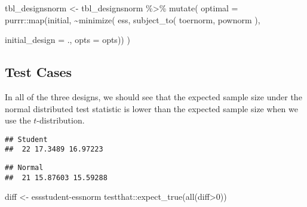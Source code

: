 \documentclass[
]{book}
\newenvironment{Shaded}{\begin{snugshade}}{\end{snugshade}}
\newcommand{\AttributeTok}[1]{\textcolor[rgb]{0.77,0.63,0.00}{#1}}
\newcommand{\DecValTok}[1]{\textcolor[rgb]{0.00,0.00,0.81}{#1}}
\newcommand{\FunctionTok}[1]{\textcolor[rgb]{0.00,0.00,0.00}{#1}}
\newcommand{\NormalTok}[1]{#1}
\newcommand{\OtherTok}[1]{\textcolor[rgb]{0.56,0.35,0.01}{#1}}
\newcommand{\SpecialCharTok}[1]{\textcolor[rgb]{0.00,0.00,0.00}{#1}}
\begin{document}
\begin{Shaded}
\begin{Highlighting}[]
\NormalTok{tbl\_designsnorm }\OtherTok{\textless{}{-}}\NormalTok{ tbl\_designsnorm }\SpecialCharTok{\%\textgreater{}\%} 
    \FunctionTok{mutate}\NormalTok{(}
       \AttributeTok{optimal =}\NormalTok{ purrr}\SpecialCharTok{::}\FunctionTok{map}\NormalTok{(initial, }\SpecialCharTok{\textasciitilde{}}\FunctionTok{minimize}\NormalTok{(}
\NormalTok{          ess,}
          \FunctionTok{subject\_to}\NormalTok{(}
\NormalTok{              toernorm,}
\NormalTok{              pownorm}
\NormalTok{          ),}
          
          \AttributeTok{initial\_design =}\NormalTok{ ., }
          \AttributeTok{opts           =}\NormalTok{ opts))  )}
\end{Highlighting}
\end{Shaded}

\hypertarget{test-cases-21}{%
\subsection{Test Cases}\label{test-cases-21}}

In all of the three designs, we should see that the expected sample size under the normal distributed test statistic is lower than the expected sample size when we use the \(t\)-distribution.

\begin{Shaded}
\end{Shaded}

\begin{verbatim}
## Student 
##  22 17.3489 16.97223
\end{verbatim}

\begin{verbatim}
## Normal 
##  21 15.87603 15.59288
\end{verbatim}

\begin{Shaded}
\begin{Highlighting}[]
\NormalTok{diff }\OtherTok{\textless{}{-}}\NormalTok{ essstudent}\SpecialCharTok{{-}}\NormalTok{essnorm}
\NormalTok{testthat}\SpecialCharTok{::}\FunctionTok{expect\_true}\NormalTok{(}\FunctionTok{all}\NormalTok{(diff}\SpecialCharTok{\textgreater{}}\DecValTok{0}\NormalTok{))}
\end{Highlighting}
\end{Shaded}


  
\end{document}
